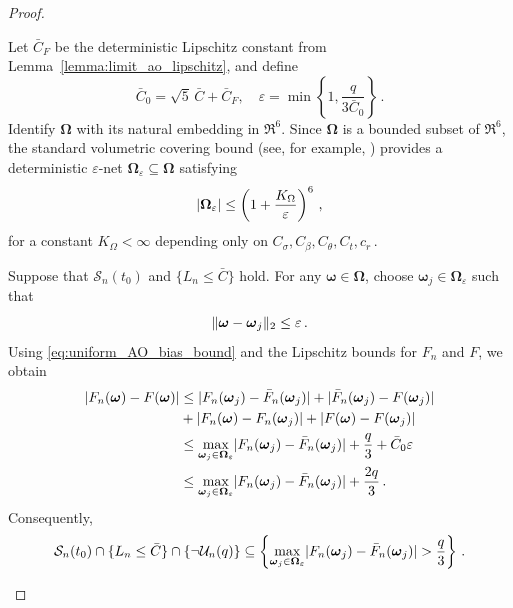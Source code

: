 \documentclass{article}
\makeatletter
\theoremstyle{definition}
\newcommand{\vnorm}[1]{%
	\ensuremath{%
		\if@display
		\left\| #1 \right\|
		\else
		\| #1 \|
		\fi
	}%
}
\newcommand{\abs}[1]{%
	\ensuremath{%
		\if@display
		\left| #1 \right|
		\else
		\lvert #1 \rvert
		\fi
	}%
}
\newcommand*{\bb}{\boldsymbol}
\makeatother
\begin{document}
\begin{bibunit}
\begin{proof}
\begin{enumerate}[label=(\roman*)]
	Let $\bar C_F$ be the deterministic Lipschitz constant from
	Lemma~\ref{lemma:limit_ao_lipschitz}, and define
	$$
		\bar C_0
		=
		\sqrt{5}\,\bar C+\bar C_F,
		\quad
		\varepsilon
		=
		\min\left\{
			1,\frac{q}{3\bar C_0}
		\right\}\,.
	$$
	Identify $\bb\Omega$ with its natural embedding in $\Re^6$.
	Since $\bb\Omega$ is a bounded subset of $\Re^6$, the standard
	volumetric covering bound
	(see, for example, \citealt[][Section~4.2]{vershynin:2018})
	provides a deterministic $\varepsilon$-net
	$\bb\Omega_\varepsilon\subseteq\bb\Omega$ satisfying
	\begin{equation}
		\label{eq:uniform_AO_net_cardinality}
		\abs{\bb\Omega_\varepsilon}
		\leq
		\left(
			1+\frac{K_\Omega}{\varepsilon}
		\right)^6\,,
	\end{equation}
	for a constant $K_\Omega<\infty$ depending only on $C_\sigma,C_\beta,C_\theta,C_t,c_r\,.$

	Suppose that $\mathcal S_n(t_0)$ and $\{L_n\leq\bar C\}$ hold.
	For any $\bb\omega\in\bb\Omega$, choose
	$\bb\omega_j\in\bb\Omega_\varepsilon$ such that
	$$
		\vnorm{
			\bb\omega-\bb\omega_j
		}_2
		\leq
		\varepsilon\,.
	$$
	Using \eqref{eq:uniform_AO_bias_bound} and the Lipschitz bounds for
	$F_n$ and $F$, we obtain
	$$
		\begin{aligned}
		\abs{
			F_n(\bb\omega)-F(\bb\omega)
		}
		&\leq
		\abs{
			F_n(\bb\omega_j)-\bar F_n(\bb\omega_j)
		}
		+
		\abs{
			\bar F_n(\bb\omega_j)-F(\bb\omega_j)
		}\\
		&+
		\abs{
			F_n(\bb\omega)-F_n(\bb\omega_j)
		}
		+
		\abs{
			F(\bb\omega)-F(\bb\omega_j)
		}\\
		&\leq
		\underset{\bb\omega_j\in\bb\Omega_\varepsilon}{\max}
		\abs{
			F_n(\bb\omega_j)-\bar F_n(\bb\omega_j)
		}
		+
		\frac{q}{3}
		+
		\bar C_0\varepsilon\\
		&\leq
		\underset{\bb\omega_j\in\bb\Omega_\varepsilon}{\max}
		\abs{
			F_n(\bb\omega_j)-\bar F_n(\bb\omega_j)
		}
		+
		\frac{2q}{3}\,.
		\end{aligned}
	$$
	Consequently,
	\begin{equation}
		\label{eq:uniform_AO_net_reduction}
		\mathcal S_n(t_0)
		\cap
		\{L_n\leq\bar C\}
		\cap
		\left\{
			\lnot\mathcal U_n(q)
		\right\}
		\subseteq
		\left\{
			\underset{\bb\omega_j\in\bb\Omega_\varepsilon}{\max}
			\abs{
			F_n(\bb\omega_j)-\bar F_n(\bb\omega_j)
			}
			>
			\frac{q}{3}
		\right\}\,.
	\end{equation}


\end{enumerate}
\end{proof}
\end{bibunit}
\end{document}
